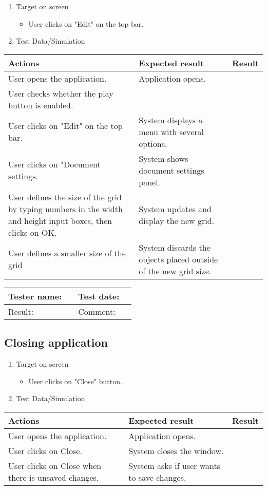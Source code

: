 \begin{enumerate}
	
	\item Target on screen
	\begin{itemize}
		\item User clicks on "Edit" on the top bar.
	\end{itemize}
	\item Test Data/Simulation
\end{enumerate}
	\begin{tabularx}{\textwidth}{|X|X|p{2.5cm}|}\hline
		Actions & Expected result & Result \\\hline
		User opens the application.& Application opens. &  \pass \\\hline
		User checks whether the play button is enabled. & &  \pass \\\hline
		User clicks on "Edit" on the top bar. & System displays a menu with several options.& \pass \\\hline
		User clicks on "Document settings. & System shows document settings panel. & \pass \\\hline
		User defines the size of the grid by typing numbers in the width and height input boxes, then clicks on OK.& System updates and display the new grid. & \pass \\\hline
		User defines a smaller size of the grid & System discards the objects placed outside of the new grid size. & \pass \\\hline
	\end{tabularx}
\begin{tabularx}{\textwidth}{|p{3cm}X|p{3cm}X|}\hline
	Tester name: &  & Test date: & \\\hline
	Result: &  \pass & Comment: & \\\hline
\end{tabularx}

\newpage
\subsection{Closing application}

\begin{enumerate}
	\item Target on screen
	\begin{itemize}
		\item User clicks on "Close" button.
	\end{itemize}
	\item Test Data/Simulation
\end{enumerate}
	\begin{tabularx}{\textwidth}{|X|X|p{2.5cm}|}\hline
		Actions & Expected result & Result \\\hline
		User opens the application.& Application opens. &  \pass \\\hline
		User clicks on Close. & System closes the window. & \pass \\\hline
		User clicks on Close when there is unsaved changes. & System asks if user wants to save changes. & \pass \\\hline
	\end{tabularx}

